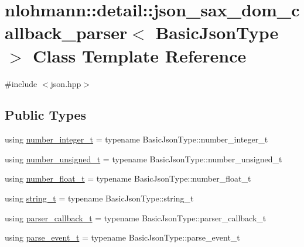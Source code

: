\hypertarget{classnlohmann_1_1detail_1_1json__sax__dom__callback__parser}{}\section{nlohmann\+::detail\+::json\+\_\+sax\+\_\+dom\+\_\+callback\+\_\+parser$<$ Basic\+Json\+Type $>$ Class Template Reference}
\label{classnlohmann_1_1detail_1_1json__sax__dom__callback__parser}


{\ttfamily \#include $<$json.\+hpp$>$}

\subsection*{Public Types}
\begin{DoxyCompactItemize}
\item 
using \mbox{\hyperlink{classnlohmann_1_1detail_1_1json__sax__dom__callback__parser_a3ba8fc7a8d83c5b0eeb3b543ad844b8d}{number\+\_\+integer\+\_\+t}} = typename Basic\+Json\+Type\+::number\+\_\+integer\+\_\+t
\item 
using \mbox{\hyperlink{classnlohmann_1_1detail_1_1json__sax__dom__callback__parser_a2406c5125f7128fb9c01921df2903001}{number\+\_\+unsigned\+\_\+t}} = typename Basic\+Json\+Type\+::number\+\_\+unsigned\+\_\+t
\item 
using \mbox{\hyperlink{classnlohmann_1_1detail_1_1json__sax__dom__callback__parser_a914ea0555cea5290449fb791ae41c655}{number\+\_\+float\+\_\+t}} = typename Basic\+Json\+Type\+::number\+\_\+float\+\_\+t
\item 
using \mbox{\hyperlink{classnlohmann_1_1detail_1_1json__sax__dom__callback__parser_a00e7d95d82d5d8a43421526a42a8eabc}{string\+\_\+t}} = typename Basic\+Json\+Type\+::string\+\_\+t
\item 
using \mbox{\hyperlink{classnlohmann_1_1detail_1_1json__sax__dom__callback__parser_a4f636086fa8e7cf26c35c8afd50903ce}{parser\+\_\+callback\+\_\+t}} = typename Basic\+Json\+Type\+::parser\+\_\+callback\+\_\+t
\item 
using \mbox{\hyperlink{classnlohmann_1_1detail_1_1json__sax__dom__callback__parser_aac6d706967b2ecc2510e172577d8550b}{parse\+\_\+event\+\_\+t}} = typename Basic\+Json\+Type\+::parse\+\_\+event\+\_\+t
\end{DoxyCompactItemize}
